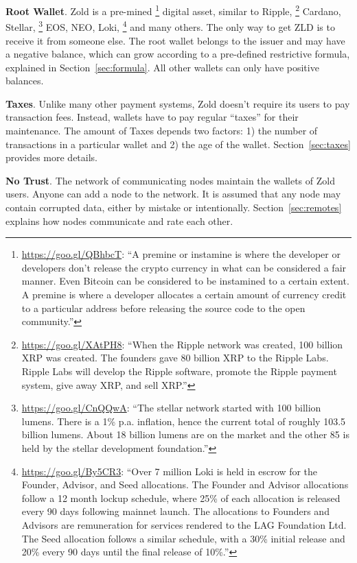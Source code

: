 \documentclass[11pt,oneside]{article}
\begin{document}
\textbf{Root Wallet}.
Zold is a pre-mined%
\footnote{%
  \url{https://goo.gl/QBhbcT}:
  ``A premine or instamine is where the developer or developers don't release
  the crypto currency in what can be considered a fair manner.
  Even Bitcoin can be considered to be instamined to a certain extent.
  A premine is where a developer allocates a certain amount of currency
  credit to a particular address before releasing the source
  code to the open community.''
}
digital asset, similar to Ripple,%
\footnote{%
  \url{https://goo.gl/XAtPH8}:
  ``When the Ripple network was created, 100 billion XRP was created.
  The founders gave 80 billion XRP to the Ripple Labs. Ripple Labs
  will develop the Ripple software, promote the Ripple payment system,
  give away XRP, and sell XRP.''
}
Cardano,
Stellar,%
\footnote{%
  \url{https://goo.gl/CnQQwA}:
  ``The stellar network started with 100 billion lumens.
  There is a 1\% p.a. inflation, hence the current total of roughly 103.5 billion lumens.
  About 18 billion lumens are on the market and the other
  85 is held by the stellar development foundation.''
}
EOS, NEO, Loki,%
\footnote{%
  \url{https://goo.gl/By5CR3}:
  ``Over 7 million Loki is held in escrow for the Founder,
  Advisor, and Seed allocations. The Founder and Advisor allocations
  follow a 12 month lockup schedule, where 25\% of each allocation is
  released every 90 days following mainnet launch. The allocations
  to Founders and Advisors are remuneration for services rendered to the
  LAG Foundation Ltd. The Seed allocation follows a similar schedule, with a
  30\% initial release and 20\% every 90 days until the final release of 10\%.''
}
and many others.
The only way to get ZLD is to receive it from someone else.
The root wallet belongs to the issuer and may have a negative balance,
which can grow according to a pre-defined restrictive formula, explained in Section~\ref{sec:formula}.
All other wallets can only have positive balances.

\textbf{Taxes}.
Unlike many other payment systems, Zold doesn't require its users
to pay transaction fees. Instead, wallets have to pay regular ``taxes'' for their maintenance.
The amount of Taxes depends two factors: 1) the number
of transactions in a particular wallet and 2) the age of the wallet.
Section~\ref{sec:taxes} provides more details.

\textbf{No Trust}.
The network of communicating nodes maintain the wallets of Zold users.
Anyone can add a node to the network.
It is assumed that any node may contain corrupted data, either by mistake or intentionally.
Section~\ref{sec:remotes} explains how nodes communicate and rate each other.
\end{document}
